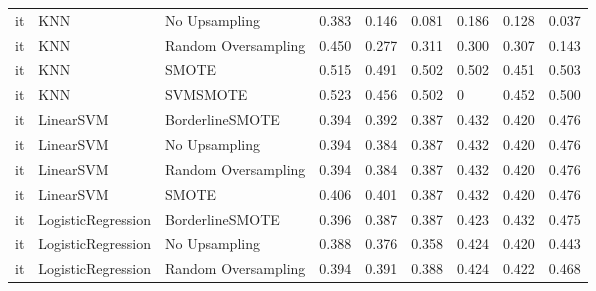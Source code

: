 \begin{tabular}{lllllllll}
      it &                          KNN &       No Upsampling & 0.383 &                     0.146 &                 0.081 &                  0.186 &                                   0.128 &     0.037 \\
      it &                          KNN & Random Oversampling & 0.450 &                     0.277 &                 0.311 &                  0.300 &                                   0.307 &     0.143 \\
      it &                          KNN &               SMOTE & 0.515 &                     0.491 &                 0.502 &                  0.502 &                                   0.451 &     0.503 \\
      it &                          KNN &            SVMSMOTE & 0.523 &                     0.456 &                 0.502 &                      0 &                                   0.452 &     0.500 \\
      it &                    LinearSVM &     BorderlineSMOTE & 0.394 &                     0.392 &                 0.387 &                  0.432 &                                   0.420 &     0.476 \\
      it &                    LinearSVM &       No Upsampling & 0.394 &                     0.384 &                 0.387 &                  0.432 &                                   0.420 &     0.476 \\
      it &                    LinearSVM & Random Oversampling & 0.394 &                     0.384 &                 0.387 &                  0.432 &                                   0.420 &     0.476 \\
      it &                    LinearSVM &               SMOTE & 0.406 &                     0.401 &                 0.387 &                  0.432 &                                   0.420 &     0.476 \\
      it &           LogisticRegression &     BorderlineSMOTE & 0.396 &                     0.387 &                 0.387 &                  0.423 &                                   0.432 &     0.475 \\
      it &           LogisticRegression &       No Upsampling & 0.388 &                     0.376 &                 0.358 &                  0.424 &                                   0.420 &     0.443 \\
      it &           LogisticRegression & Random Oversampling & 0.394 &                     0.391 &                 0.388 &                  0.424 &                                   0.422 &     0.468 \\

\end{tabular}
